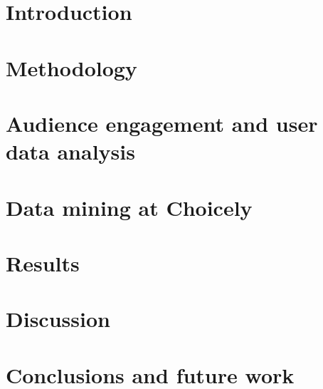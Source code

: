 \documentclass[english]{tktltiki}
\begin{document}
\mytableofcontents
	\section{Introduction}
	\label{section::introduction}
	
	\pagebreak
	
	\section{Methodology}
	\label{section::methodology}
	
	\pagebreak
	
	\section{Audience engagement and user data analysis}
	\label{section::audience-engagement-and-user-data-analysis}
	
	\pagebreak
	
	\section{Data mining at Choicely}
	\label{section::data-mining-at-choicely}
	
	\pagebreak

	\section{Results}
	\label{section::results}
	
	\pagebreak

	\section{Discussion}
	\label{section::discussion}
	
	\pagebreak

	\section{Conclusions and future work}
	\label{section::conclusions}
	
\pagebreak
\nocite{*}



\lastpage
\appendices
\pagestyle{empty}
\end{document}
